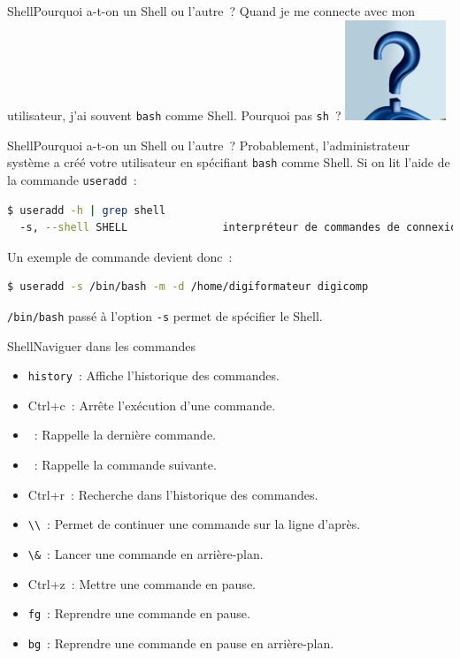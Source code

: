 \documentclass{beamer}
\begin{document}
    \begin{frame}{Shell}{Pourquoi a-t-on un Shell ou l'autre~?}
        Quand je me connecte avec mon utilisateur, j'ai souvent \lstinline{bash} comme Shell.
        Pourquoi pas \lstinline{sh}~?
        \bigbreak
        \centering
        \includegraphics[width=3cm]{image/question-mark-on-a-blank-background.png}
    \end{frame}

    \begin{frame}[fragile]{Shell}{Pourquoi a-t-on un Shell ou l'autre~?}
        Probablement, l'administrateur système a créé votre utilisateur en spécifiant \lstinline{bash} comme Shell.
        \bigbreak
        Si on lit l'aide de la commande \lstinline{useradd}~:
        \begin{lstlisting}[language=bash]
$ useradd -h | grep shell
  -s, --shell SHELL               interpréteur de commandes de connexion du nouveau compte
        \end{lstlisting}
        \bigbreak
        Un exemple de commande devient donc~:
        \begin{lstlisting}[language=bash]
$ useradd -s /bin/bash -m -d /home/digiformateur digicomp
        \end{lstlisting}
        \bigbreak
        \lstinline{/bin/bash} passé à l'option \lstinline{-s} permet de spécifier le Shell.
    \end{frame}

    \begin{frame}{Shell}{Naviguer dans les commandes}
        \begin{itemize}
            \item \lstinline{history}~: Affiche l'historique des commandes.
            \item Ctrl+c~: Arrête l'exécution d'une commande.
            \item {}~: Rappelle la dernière commande.
            \item {}~: Rappelle la commande suivante.
            \item Ctrl+r~: Recherche dans l'historique des commandes.
            \item \lstinline{\\}~: Permet de continuer une commande sur la ligne d'après.
            \item \lstinline{\&}~: Lancer une commande en arrière-plan.
            \item Ctrl+z~: Mettre une commande en pause.
            \item \lstinline{fg}~: Reprendre une commande en pause.
            \item \lstinline{bg}~: Reprendre une commande en pause en arrière-plan.
        \end{itemize}
    \end{frame}
\end{document}
